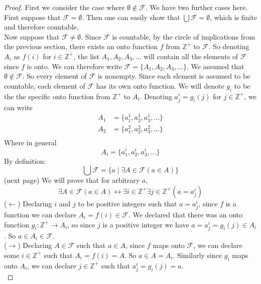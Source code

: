 \documentclass{report}
\theoremstyle{definition}
\begin{document}
\begin{proof}
First we consider the case where $\emptyset\notin\mathcal F$. We have two further cases here. First suppose that $\mathcal F=\emptyset$. Then one can easily show that $\bigcup\mathcal F=\emptyset$, 
which is finite and therefore countable.\\
\indent Now suppose that $\mathcal F\neq\emptyset$. Since $\mathcal F$ is countable, by the circle of implications from the previous section, there exists an onto function $f$ from $\mathbb Z^+$ 
to $\mathcal F$. So denoting $A_i$ as $f(i)$ for $i\in\mathbb Z^+$, the list $A_1,A_2,A_3,\ldots$ will contain all the elements of $\mathcal F$ since $f$ is onto. 
We can therefore write $\mathcal F=\{A_1,A_2,A_3,\ldots\}$. We assumed that $\emptyset\notin\mathcal F$. So every element of $\mathcal F$ is nonempty. Since each element is assumed to be countable,
each element of $\mathcal F$ has its own onto function. We will denote $g_i$ to be the the specific onto function from $\mathbb Z^+$ to $A_i$. Denoting $a^i_j=g_i(j)$ for $j\in\mathbb Z^+$, we can 
write
\begin{align*}
A_1&=\{a^1_1,a^1_2,a^1_3,\ldots\}\\
A_2&=\{a^2_1,a^2_2,a^2_3,\ldots\}\\
\end{align*}
Where in general
\begin{equation*}
A_i=\{a^i_1,a^i_2,a^i_3,\ldots\}
\end{equation*}
By definition:
\begin{equation*}
\bigcup\mathcal F=\{a\mid\exists A\in\mathcal F(a\in A)\}
\end{equation*}
(next page)\newpage
We will prove that for arbitrary $a$,
\begin{equation*}
\exists A\in\mathcal F(a\in A)\leftrightarrow\exists i\in\mathbb Z^+\exists j\in\mathbb Z^+(a=a^i_j)
\end{equation*}
($\leftarrow$) Declaring $i$ and $j$ to be positive integers such that $a=a^i_j$, since $f$ is a function we can
declare $A_i=f(i)\in\mathcal F$. We declared that there was an onto function $g_i:\mathbb Z^+\to A_i$, so since $j$ is a positive integer we have $a=a^i_j=g_i(j)\in A_i$.
So $a\in A_i\in\mathcal F$.\\
\indent($\rightarrow$) Declaring $A\in\mathcal F$ such that $a\in A$, since $f$ maps onto $\mathcal F$, we can declare some $i\in\mathbb Z^+$ such that $A_i=f(i)=A$. So $a\in A=A_i$. 
Similarly since $g_i$ maps onto $A_i$, we can declare $j\in\mathbb Z^+$ such that $a^i_j=g_i(j)=a$.\\

\end{proof}
\end{document}

